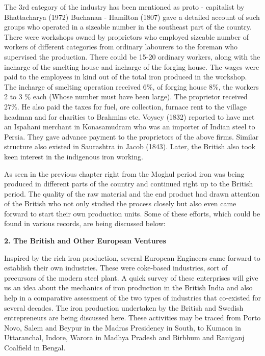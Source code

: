 The 3rd category of the industry has been mentioned as proto - capitalist by Bhattacharya (1972) Buchanan - Hamilton (1807) gave a detailed account of such groups who operated in a sizeable number in the southeast part of the country. There were workshops owned by proprietors who employed sizeable number of workers of different categories from ordinary labourers to the foreman who supervised the production. There could be 15-20 ordinary workers, along with the incharge of the smelting house and incharge of the forging house. The wages were paid to the employees in kind out of the total iron produced in the workshop. The incharge of smelting operation received 6\%, of forging house 8\%, the workers 2 to 3 \% each (Whose number must have been large). The proprietor received 27\%. He also paid the taxes for fuel, ore collection, furnace rent to the village headman and for charities to Brahmins etc. Voysey (1832) reported to have met an Ispahani merchant in Konasamudram who was an importer of Indian steel to Persia. They gave advance payment to the proprietors of the above firms. Similar structure also existed in Saurashtra in Jacob (1843). Later, the British also took keen interest in the indigenous iron working.

As seen in the previous chapter right from the Moghul period iron was being produced in different parts of the country and continued right up to the British period. The quality of the raw material and the end product had drawn attention of the British who not only studied the process closely but also even came forward to start their own production units. Some of these efforts, which could be found in various records, are being discussed below:

\textbf{2. The British and Other European Ventures}

Inspired by the rich iron production, several European Engineers came forward to establish their own industries. These were coke-based industries, sort of precursors of the modern steel plant. A quick survey of these enterprises will give us an idea about the mechanics of iron production in the British India and also help in a comparative assessment of the two types of industries that co-existed for several decades. The iron production undertaken by the British and Swedish entrepreneurs are being discussed here. These activities may be traced from Porto Novo, Salem and Beypur in the Madras Presidency in South, to Kumaon in Uttaranchal, Indore, Warora in Madhya Pradesh and Birbhum and Raniganj Coalfield in Bengal.

